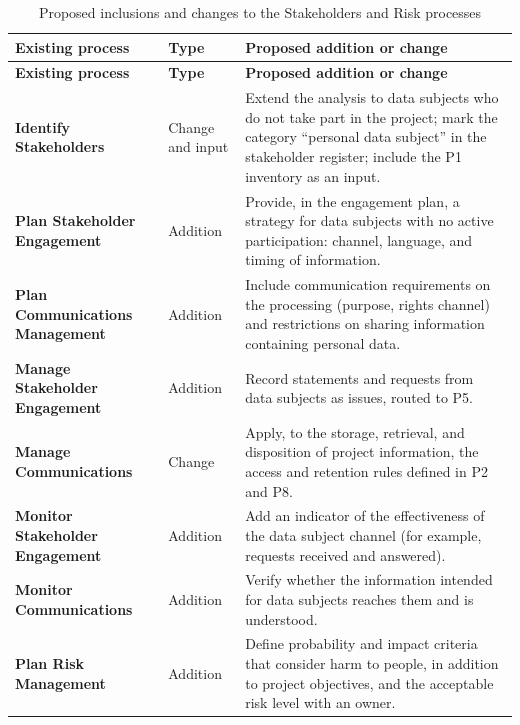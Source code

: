 \documentclass[11pt,a4paper]{article}
\newcommand{\SingleSpacing}{}
\begin{document}
\begingroup\SingleSpacing\small
\begin{longtable}{@{}>{\raggedright\arraybackslash}p{}>{\raggedright\arraybackslash}p{}>{\raggedright\arraybackslash}p{}@{}}
\caption{Proposed inclusions and changes to the Stakeholders and Risk processes}\label{tab:t10}\\
\toprule
\textbf{Existing process} & \textbf{Type} & \textbf{Proposed addition or change}\\
\midrule
\endfirsthead
\toprule
\textbf{Existing process} & \textbf{Type} & \textbf{Proposed addition or change}\\
\midrule
\endhead
\bottomrule
\endfoot
\bottomrule
\endlastfoot
\textbf{Identify Stakeholders} & Change and input & Extend the analysis to data subjects who do not take part in the project; mark the category \textquotedblleft{}personal data subject\textquotedblright{} in the stakeholder register; include the P1 inventory as an input.\\[3pt]
\textbf{Plan Stakeholder Engagement} & Addition & Provide, in the engagement plan, a strategy for data subjects with no active participation: channel, language, and timing of information.\\[3pt]
\textbf{Plan Communications Management} & Addition & Include communication requirements on the processing (purpose, rights channel) and restrictions on sharing information containing personal data.\\[3pt]
\textbf{Manage Stakeholder Engagement} & Addition & Record statements and requests from data subjects as issues, routed to P5.\\[3pt]
\textbf{Manage Communications} & Change & Apply, to the storage, retrieval, and disposition of project information, the access and retention rules defined in P2 and P8.\\[3pt]
\textbf{Monitor Stakeholder Engagement} & Addition & Add an indicator of the effectiveness of the data subject channel (for example, requests received and answered).\\[3pt]
\textbf{Monitor Communications} & Addition & Verify whether the information intended for data subjects reaches them and is understood.\\[3pt]
\textbf{Plan Risk Management} & Addition & Define probability and impact criteria that consider harm to people, in addition to project objectives, and the acceptable risk level with an owner.\\[3pt]

\end{longtable}
\end{document}
